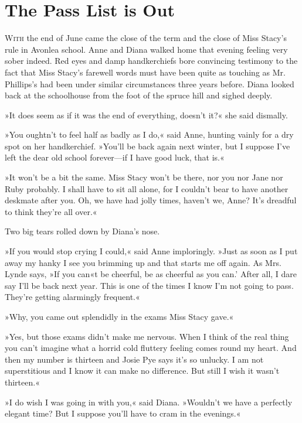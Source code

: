 \chapter{The Pass List is Out}

\lettrine[lines=4]{W}{ith} the end of June came the close of the term and the close of Miss Stacy’s rule in Avonlea school. Anne and Diana walked home that evening feeling very sober indeed. Red eyes and damp handkerchiefs bore convincing testimony to the fact that Miss Stacy’s farewell words must have been quite as touching as Mr. Phillips’s had been under similar circumstances three years before. Diana looked back at the schoolhouse from the foot of the spruce hill and sighed deeply.

»It does seem as if it was the end of everything, doesn’t it?« she said dismally.

»You oughtn’t to feel half as badly as I do,« said Anne, hunting vainly for a dry spot on her handkerchief. »You’ll be back again next winter, but I suppose I’ve left the dear old school forever—if I have good luck, that is.«

»It won’t be a bit the same. Miss Stacy won’t be there, nor you nor Jane nor Ruby probably. I shall have to sit all alone, for I couldn’t bear to have another deskmate after you. Oh, we have had jolly times, haven’t we, Anne? It’s dreadful to think they’re all over.«

Two big tears rolled down by Diana’s nose.

»If you would stop crying I could,« said Anne imploringly. »Just as soon as I put away my hanky I see you brimming up and that starts me off again. As Mrs. Lynde says, »If you can«t be cheerful, be as cheerful as you can.’ After all, I dare say I’ll be back next year. This is one of the times I know I’m not going to pass. They’re getting alarmingly frequent.«

»Why, you came out splendidly in the exams Miss Stacy gave.«

»Yes, but those exams didn’t make me nervous. When I think of the real thing you can’t imagine what a horrid cold fluttery feeling comes round my heart. And then my number is thirteen and Josie Pye says it’s so unlucky. I am not superstitious and I know it can make no difference. But still I wish it wasn’t thirteen.«

»I do wish I was going in with you,« said Diana. »Wouldn’t we have a perfectly elegant time? But I suppose you’ll have to cram in the evenings.«

